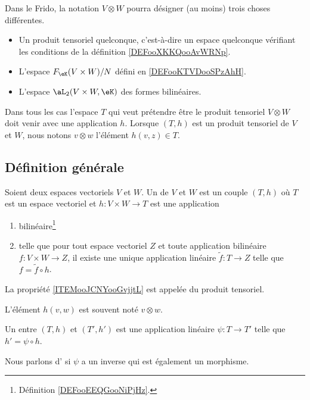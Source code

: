\begin{normaltext}
	Dans le Frido, la notation \( V\otimes W\) pourra désigner (au moins) trois choses différentes.
	\begin{itemize}
		\item
		      Un produit tensoriel quelconque, c'est-à-dire un espace quelconque vérifiant les conditions de la définition \ref{DEFooXKKQooAvWRNp}.
		\item
		      L'espace $F_{\eK}(V\times W)/N$ défini en \ref{DEFooKTVDooSPzAhH}.
		\item
		      L'espace \( \aL_2(V\times W,\eK)\) des formes bilinéaires.
	\end{itemize}
	Dans tous les cas l'espace \( T\) qui veut prétendre être le produit tensoriel \( V\otimes W\) doit venir avec une application \( h\). Lorsque \( (T,h)\) est un produit tensoriel de \( V\) et \( W\), nous notons \( v\otimes w\) l'élément \( h(v,z)\in T\).
\end{normaltext}

\subsection{Définition générale}

\begin{definition}       \label{DEFooXKKQooAvWRNp}
	Soient deux espaces vectoriels \( V\) et \( W\). Un  de \( V\) et \( W\) est un couple \( (T,h)\) où \( T\) est un espace vectoriel et \( h\colon V\times W\to T\) est une application
	\begin{enumerate}
		\item
		      bilinéaire\footnote{Définition \ref{DEFooEEQGooNiPjHz}.}
		\item       \label{ITEMooJCNYooGvjjtL}
		      telle que pour tout espace vectoriel \( Z\) et toute application bilinéaire \( f\colon V\times W\to Z\), il existe une unique application linéaire \( \tilde f\colon T\to Z\) telle que \( f=\tilde f\circ h\).
	\end{enumerate}
	La propriété \ref{ITEMooJCNYooGvjjtL} est appelée  du produit tensoriel.

	L'élément \( h(v,w)\) est souvent noté \( v\otimes w\).
\end{definition}

\begin{definition}  \label{DEFooPLHTooRiHjlE}
	Un  entre \( (T,h)\) et \( (T',h')\) est une application linéaire \( \psi\colon T\to T'\) telle que \( h'=\psi\circ h\).

	Nous parlons d' si \( \psi\) a un inverse qui est également un morphisme.
\end{definition}

